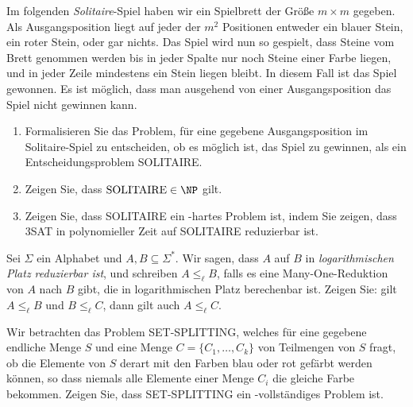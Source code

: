\documentclass[german]{latteachCD}[2017/03/28]
\begin{document}
\begin{exercise}
  Im folgenden \emph{Solitaire}-Spiel haben wir ein Spielbrett der Größe $m
  \times m$ gegeben.  Als Ausgangsposition liegt auf jeder der $m^{2}$
  Positionen entweder ein blauer Stein, ein roter Stein, oder gar nichts.  Das
  Spiel wird nun so gespielt, dass Steine vom Brett genommen werden bis in jeder
  Spalte nur noch Steine einer Farbe liegen, und in jeder Zeile mindestens ein
  Stein liegen bleibt.  In diesem Fall ist das Spiel gewonnen.  Es ist möglich,
  dass man ausgehend von einer Ausgangsposition das Spiel nicht gewinnen kann.

  \begin{enumerate}
  \item Formalisieren Sie das Problem, für eine gegebene Ausgangsposition im
    Solitaire-Spiel zu entscheiden, ob es möglich ist, das Spiel zu gewinnen,
    als ein Entscheidungsproblem SOLITAIRE.
  \item Zeigen Sie, dass $\text{SOLITAIRE} \in \NP$ gilt.
  \item Zeigen Sie, dass SOLITAIRE ein \NP-hartes Problem ist, indem Sie zeigen,
    dass 3SAT in polynomieller Zeit auf SOLITAIRE reduzierbar ist.
  \end{enumerate}
\end{exercise}

\begin{exercise}
  Sei $\Sigma$ ein Alphabet und $A, B \subseteq \Sigma^{*}$.  Wir sagen, dass
  $A$ auf $B$ in \emph{logarithmischen Platz reduzierbar ist}, und schreiben $A
  \leq_{\ell} B$, falls es eine Many-One-Reduktion von $A$ nach $B$ gibt, die in
  logarithmischen Platz berechenbar ist.  Zeigen Sie: gilt $A \leq_{\ell} B$ und
  $B \leq_{\ell} C$, dann gilt auch $A \leq_{\ell} C$.
\end{exercise}

\begin{exercise}
  Wir betrachten das Problem SET-SPLITTING, welches für eine gegebene endliche
  Menge $S$ und eine Menge $C = \{C_{1}, \dots, C_{k}\}$ von Teilmengen von $S$
  fragt, ob die Elemente von $S$ derart mit den Farben blau oder rot gefärbt
  werden können, so dass niemals alle Elemente einer Menge $C_{i}$ die gleiche
  Farbe bekommen.  Zeigen Sie, dass SET-SPLITTING ein \NP-vollständiges Problem
  ist.
\end{exercise}
\end{document}
